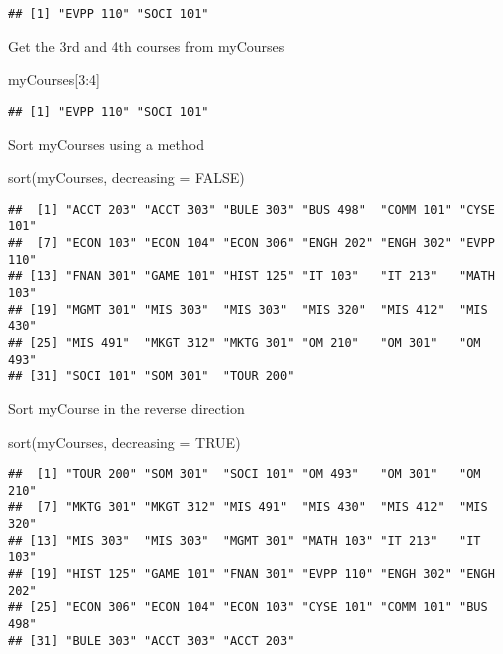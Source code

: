\documentclass[]{article}
\newenvironment{Shaded}{\begin{snugshade}}{\end{snugshade}}
\newcommand{\AttributeTok}[1]{\textcolor[rgb]{0.77,0.63,0.00}{#1}}
\newcommand{\ConstantTok}[1]{\textcolor[rgb]{0.00,0.00,0.00}{#1}}
\newcommand{\DecValTok}[1]{\textcolor[rgb]{0.00,0.00,0.81}{#1}}
\newcommand{\FunctionTok}[1]{\textcolor[rgb]{0.00,0.00,0.00}{#1}}
\newcommand{\NormalTok}[1]{#1}
\newcommand{\SpecialCharTok}[1]{\textcolor[rgb]{0.00,0.00,0.00}{#1}}
\begin{document}
\begin{verbatim}
## [1] "EVPP 110" "SOCI 101"
\end{verbatim}

Get the 3rd and 4th courses from myCourses

\begin{Shaded}
\begin{Highlighting}[]
\NormalTok{myCourses[}\DecValTok{3}\SpecialCharTok{:}\DecValTok{4}\NormalTok{]}
\end{Highlighting}
\end{Shaded}

\begin{verbatim}
## [1] "EVPP 110" "SOCI 101"
\end{verbatim}

Sort myCourses using a method

\begin{Shaded}
\begin{Highlighting}[]
\FunctionTok{sort}\NormalTok{(myCourses, }\AttributeTok{decreasing =} \ConstantTok{FALSE}\NormalTok{)}
\end{Highlighting}
\end{Shaded}

\begin{verbatim}
##  [1] "ACCT 203" "ACCT 303" "BULE 303" "BUS 498"  "COMM 101" "CYSE 101"
##  [7] "ECON 103" "ECON 104" "ECON 306" "ENGH 202" "ENGH 302" "EVPP 110"
## [13] "FNAN 301" "GAME 101" "HIST 125" "IT 103"   "IT 213"   "MATH 103"
## [19] "MGMT 301" "MIS 303"  "MIS 303"  "MIS 320"  "MIS 412"  "MIS 430" 
## [25] "MIS 491"  "MKGT 312" "MKTG 301" "OM 210"   "OM 301"   "OM 493"  
## [31] "SOCI 101" "SOM 301"  "TOUR 200"
\end{verbatim}

Sort myCourse in the reverse direction

\begin{Shaded}
\begin{Highlighting}[]
\FunctionTok{sort}\NormalTok{(myCourses, }\AttributeTok{decreasing =} \ConstantTok{TRUE}\NormalTok{)}
\end{Highlighting}
\end{Shaded}

\begin{verbatim}
##  [1] "TOUR 200" "SOM 301"  "SOCI 101" "OM 493"   "OM 301"   "OM 210"  
##  [7] "MKTG 301" "MKGT 312" "MIS 491"  "MIS 430"  "MIS 412"  "MIS 320" 
## [13] "MIS 303"  "MIS 303"  "MGMT 301" "MATH 103" "IT 213"   "IT 103"  
## [19] "HIST 125" "GAME 101" "FNAN 301" "EVPP 110" "ENGH 302" "ENGH 202"
## [25] "ECON 306" "ECON 104" "ECON 103" "CYSE 101" "COMM 101" "BUS 498" 
## [31] "BULE 303" "ACCT 303" "ACCT 203"
\end{verbatim}
\end{document}
